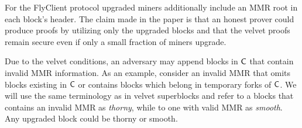 %

	For the FlyClient protocol upgraded miners additionally include an MMR root in each block's header.
    The claim made in the paper is that an honest prover could produce proofs
    by utilizing only the upgraded blocks and that the velvet proofs remain secure even if only a small fraction of miners upgrade. 

    Due to the velvet conditions, an adversary may append blocks in $\mathsf{C}$ that contain invalid MMR information.
    As an example, consider an invalid MMR that omits blocks existing in $\mathsf{C}$ or contains blocks which belong in temporary forks of $\mathsf{C}$.
    We will use the same terminology as in velvet superblocks and refer to a blocks that contains an invalid MMR as \emph{thorny}, while to one with valid MMR as \emph{smooth}.
    Any upgraded block could be thorny or smooth.

